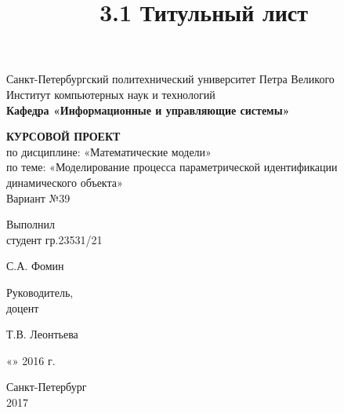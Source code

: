 \documentclass[a4paper, 12pt]{article}
\title{3.1 Титульный лист}
\begin{document}
\thispagestyle{empty}

\begin{center}
    Санкт-Петербургский политехнический университет Петра Великого\\
    Институт компьютерных наук и технологий\\
    \bfseries{Кафедра «Информационные и управляющие системы»}
\end{center}

\vspace{20ex}

\begin{center}
    {
    \LARGE \textbf{КУРСОВОЙ ПРОЕКТ} \\[3ex]
    по дисциплине: «Математические модели» \\
    по теме: «Моделирование процесса параметрической идентификации динамического объекта» \\[3ex]
    Вариант №39
    }
\end{center}

\vspace{40ex}

\noindent Выполнил\\
студент гр.23531/21\hfill
\begin{minipage}{0.7\textwidth}
    \hfill \uline{\hspace{3cm}} \hspace{1.1cm} С.А. Фомин
\end{minipage}

\vspace{3ex}

\noindent Руководитель,\\
доцент\hfill
\begin{minipage}{0.7\textwidth}
    \hfill \uline{\hspace{3cm}} \hspace{0.5cm} Т.В. Леонтьева
\end{minipage}

\vspace{3ex}

\hfill \begin{minipage}{0.6\textwidth} \hfill «\uline{\hspace{1cm}}»\uline{\hspace{3cm}} 2016 г.\end{minipage}

\vfill

\begin{center}
    Санкт-Петербург\\
    2017
\end{center}
\end{document}
